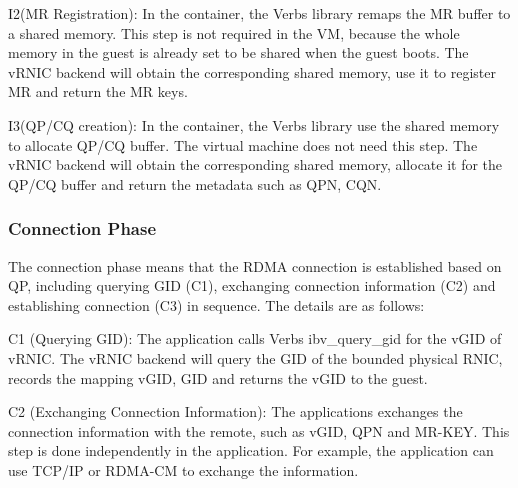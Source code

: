 
I2(MR Registration): In the container, the Verbs library remaps the MR buffer to a shared memory. This step is not required in the VM, because the whole memory in the guest is already set to be shared when the guest boots. The vRNIC backend will obtain the corresponding shared memory, use it to register MR and return the MR keys. 


I3(QP/CQ creation): In the container, the Verbs library use the shared memory to allocate QP/CQ buffer. The virtual machine does not need this step. The vRNIC backend will obtain the corresponding shared memory, allocate it for the QP/CQ buffer and return the metadata such as QPN, CQN.

\subsubsection{Connection Phase}


The connection phase means that the RDMA connection is established based on QP, including querying GID (C1), exchanging connection information (C2) and establishing connection (C3) in sequence. The details are as follows:

C1 (Querying GID): The application calls Verbs ibv\_query\_gid for the vGID of vRNIC. The vRNIC backend will query the GID of the bounded physical RNIC, records the mapping {vGID, GID} and returns the vGID to the guest.

C2 (Exchanging Connection Information): The applications exchanges the connection information with the remote, such as vGID, QPN and MR-KEY. This step is done independently in the application. For example, the application can use TCP/IP or RDMA-CM to exchange the information.

